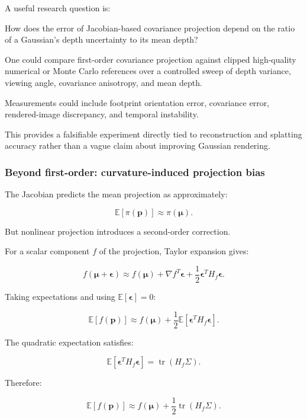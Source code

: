 A useful research question is:

How does the error of Jacobian-based covariance projection depend on the ratio of a Gaussian's depth uncertainty to its mean depth?

One could compare first-order covariance projection against clipped high-quality numerical or Monte Carlo references over a controlled sweep of depth variance, viewing angle, covariance anisotropy, and mean depth.

Measurements could include footprint orientation error, covariance error, rendered-image discrepancy, and temporal instability.

This provides a falsifiable experiment directly tied to reconstruction and splatting accuracy rather than a vague claim about improving Gaussian rendering.

\subsubsection{Beyond first-order: curvature-induced projection bias}\label{02-foundations-ii-ch021-beyond-first-order-curvature-induced-projection-bias}

\hypertarget{02-foundations-ii-ch021-beyond-first-order-curvature-induced-projection-bias}{}

The Jacobian predicts the mean projection as approximately:

\[
\mathbb E[\pi(\mathbf p)] \approx\pi(\boldsymbol\mu).
\]

But nonlinear projection introduces a second-order correction.

For a scalar component \(f\) of the projection, Taylor expansion gives:

\[
f(\boldsymbol\mu+\boldsymbol\epsilon) \approx f(\boldsymbol\mu) + \nabla f^T\boldsymbol\epsilon + \frac12\boldsymbol\epsilon^TH_f\boldsymbol\epsilon.
\]

Taking expectations and using \(\mathbb E[\boldsymbol\epsilon]=0\):

\[
\mathbb E[f(\mathbf p)] \approx f(\boldsymbol\mu) + \frac12\mathbb E[ \boldsymbol\epsilon^TH_f\boldsymbol\epsilon ].
\]

The quadratic expectation satisfies:

\[
\mathbb E[ \boldsymbol\epsilon^TH_f\boldsymbol\epsilon ] = \operatorname{tr}(H_f\Sigma).
\]

Therefore:

\[
\boxed{ \mathbb E[f(\mathbf p)] \approx f(\boldsymbol\mu)+ \frac12\operatorname{tr}(H_f\Sigma) }.
\]

